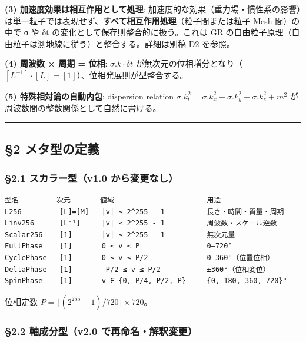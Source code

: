 \documentclass[a4paper,11pt]{ltjsarticle}
\begin{document}
\textbf{(3) 加速度効果は相互作用として処理}:
加速度的な効果（重力場・慣性系の影響）は単一粒子では表現せず、\textbf{すべて相互作用処理}（粒子間または粒子-Mesh
間）の中で σ や δt の変化として保存則整合的に扱う。これは GR
の自由粒子原理（自由粒子は測地線に従う）と整合する。詳細は別稿 D2
を参照。

\textbf{(4) 周波数 × 周期 = 位相}: \(\sigma.k \cdot \delta t\)
が無次元の位相増分となり（\([L^{-1}] \cdot [L] = [1]\)）、位相発展則が型整合する。

\textbf{(5) 特殊相対論の自動内包}: dispersion relation
\(\sigma.k_t^2 = \sigma.k_x^2 + \sigma.k_y^2 + \sigma.k_z^2 + m^2\)
が周波数間の整数関係として自然に書ける。

\begin{center}\rule{0.5\linewidth}{0.5pt}\end{center}

\subsection{§2 メタ型の定義}\label{ux30e1ux30bfux578bux306eux5b9aux7fa9}

\subsubsection{§2.1 スカラー型（v1.0
から変更なし）}\label{ux30b9ux30abux30e9ux30fcux578bv1.0-ux304bux3089ux5909ux66f4ux306aux3057}

\begin{verbatim}
型名         次元       値域                      用途
L256         [L]=[M]   |v| ≤ 2^255 - 1          長さ・時間・質量・周期
Linv256      [L⁻¹]     |v| ≤ 2^255 - 1          周波数・スケール逆数
Scalar256    [1]       |v| ≤ 2^255 - 1          無次元量
FullPhase    [1]       0 ≤ v ≤ P                0–720°
CyclePhase   [1]       0 ≤ v ≤ P/2              0–360°（位置位相）
DeltaPhase   [1]       -P/2 ≤ v ≤ P/2           ±360°（位相変位）
SpinPhase    [1]       v ∈ {0, P/4, P/2, P}     {0, 180, 360, 720}°
\end{verbatim}

位相定数 \(P = \lfloor (2^{255}-1)/720 \rfloor \times 720\)。

\subsubsection{§2.2 軸成分型（v2.0
で再命名・解釈変更）}\label{ux8ef8ux6210ux5206ux578bv2.0-ux3067ux518dux547dux540dux89e3ux91c8ux5909ux66f4}
\end{document}
